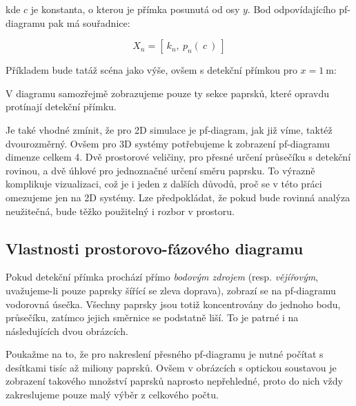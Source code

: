 kde $c$ je konstanta, o kterou je přímka posunutá od osy $y$. Bod odpovídajícího pf-dia\-gra\-mu pak má souřadnice:

\[ X_n = [\ k_n,\ p_n(\ c\ )\ ] \]

Příkladem bude tatáž scéna jako výše, ovšem s detekční přímkou pro $x = 1\ \mathrm{m}$:


V diagramu samozřejmě zobrazujeme pouze ty sekce paprsků, které opravdu protínají detekční přímku.

Je také vhodné zmínit, že pro 2D simulace je pf-diagram, jak již víme, taktéž dvourozměrný. Ovšem pro 3D systémy potřebujeme k zobrazení pf-diagramu dimenze celkem 4. Dvě prostorové veličiny, pro přesné určení průsečíku s detekční rovinou, a dvě úhlové pro jednoznačné určení směru paprsku. To výrazně komplikuje vizualizaci, což je i jeden z dalších důvodů, proč se v této práci omezujeme jen na 2D systémy. Lze předpokládat, že pokud bude rovinná analýza neužitečná, bude těžko použitelný i rozbor v prostoru.


\subsection{Vlastnosti prostorovo-fázového diagramu}
\label{sub:analyzasystemu_vlastnostipfdiagramu}

Pokud detekční přímka prochází přímo \emph{bodovým zdrojem} (resp. \emph{vějířovým}, uvažujeme-li pouze paprsky šířící se zleva doprava), zobrazí se na pf-diagramu vodorovná úsečka. Všechny paprsky jsou totiž koncentrovány do jednoho bodu, průsečíku, zatímco jejich směrnice se podstatně liší. To je patrné i na následujících dvou obrázcích.

Poukažme na to, že pro nakreslení přesného pf-diagramu je nutné počítat s desítkami tisíc až miliony paprsků. Ovšem v obrázcích s optickou soustavou je zobrazení takového množství paprsků naprosto nepřehledné, proto do nich vždy zakreslujeme pouze malý výběr z celkového počtu.



